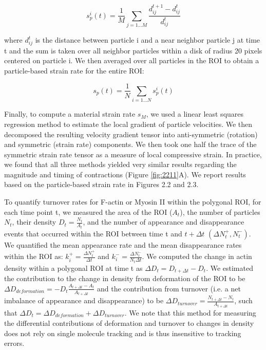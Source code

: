 $$ s_{p}^i(t) = \frac{1}{M} \sum_{j=1...M} \frac{d_{ij}^{t+1} - d_{ij}^{t}}{d_{ij}^{t}}$$

where $d_{ij}^{t}$ is the distance between particle i and a near neighbor particle j at time t and the sum is taken over all neighbor particles within a disk of radius 20 pixels centered on particle i. We then averaged over all particles in the ROI to obtain a particle-based strain rate for the entire ROI:

$$s_{p}(t) = \frac{1}{N} \sum_{i=1...N} s_{p}^i(t)$$

Finally, to compute a material strain rate $s_M$, we used a linear least squares regression method to estimate the local gradient of particle velocities. We then decomposed the resulting velocity gradient tensor into anti-symmetric (rotation) and symmetric (strain rate) components. We then took one half the trace of the symmetric strain rate tensor as a measure of local compressive strain. In practice, we found that all three methods yielded very similar results regarding the magnitude and timing of contractions (Figure \ref{fig:2211}A).  We report results based on the particle-based strain rate in Figures 2.2 and 2.3.


To quantify turnover rates for F-actin or Myosin II within the polygonal ROI, for each time point t, we measured the area of the ROI ($A_{t}$), the number of particles $N_{t}$, their density $D_{t} = \frac{N_{t}}{A_{t}}$, and the number of appearance and disappearance events that occurred within the ROI between time t and $t+\Delta t$ $(\Delta N_{t}^+,N_{t}^-)$.  We quantified the mean appearance rate and the mean disappearance rates within the ROI as: $k_{i}^+ = \frac{\Delta N_{t}^+} {\Delta t}$ and $k_{i}^- = \frac{\Delta N_{t}^-} {N_{t}\Delta t}$.  We computed the change in actin density within a polygonal ROI at time t as $\Delta D_{t} = D_{t+\Delta t} - D_{t}$.  We estimated the contribution to the change in density from deformation of the ROI to be $\Delta D_{\textit{deformation}} = -D_{t}\frac{A_{t+\Delta t} - A_{t}}{A_{t+\Delta t}}$ and the contribution from turnover (i.e. a net imbalance of appearance and disappearance) to be $\Delta D_{\textit{turnover}} = \frac{N_{t+\Delta t} - N_{t} } {A_{t+\Delta t}}$, such that $\Delta D_{t} = \Delta D_{\textit{deformation}} + \Delta D_{\textit{turnover}}$.  We note that this method for measuring the differential contributions  of deformation and turnover to changes in density does not rely on single molecule tracking and is thus insensitive to tracking errors.



